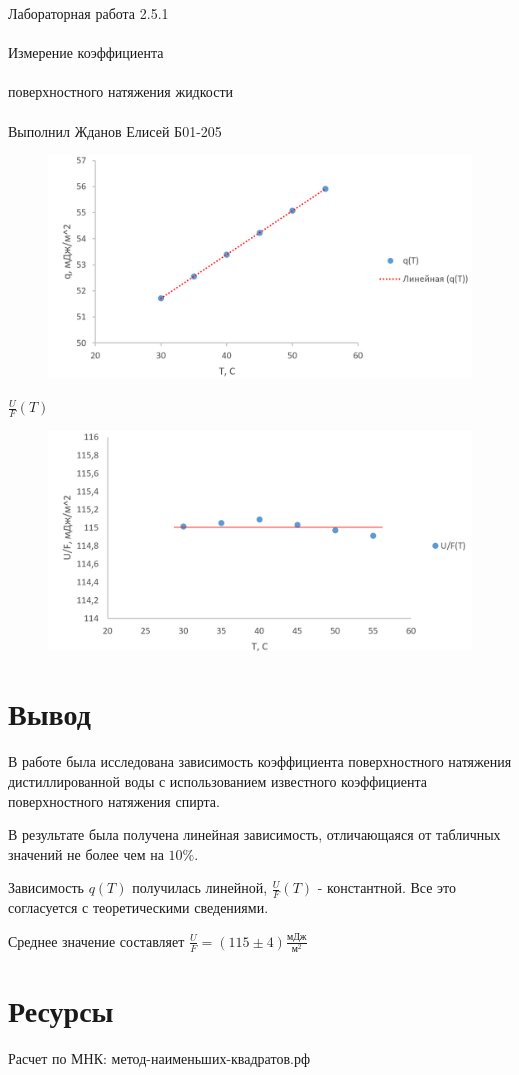 \documentclass{astroedu-lab}
\begin{document}
\begin{problem}{\huge Лабораторная работа 2.5.1\\\\Измерение коэффициента\\\\поверхностного натяжения жидкости\\\\Выполнил Жданов Елисей Б01-205}
\begin{figure}[!h]
	\centering
	\includegraphics[width=1\textwidth]{2023-02-23_22-23-59.png}
	\label{fig:boiler}
\end{figure}

\begin{center}
	\Large $\frac{U}{F}(T)$
\end{center}

\begin{figure}[!h]
	\centering
	\includegraphics[width=1\textwidth]{2023-02-23_22-26-14.png}
	\label{fig:boiler}
\end{figure}

\section{Вывод}

В работе была исследована зависимость коэффициента поверхностного натяжения дистиллированной воды с использованием известного коэффициента поверхностного натяжения спирта.

В результате была получена линейная зависимость, отличающаяся от табличных значений не более чем на $10\%$.

Зависимость $q(T)$ получилась линейной, $\frac{U}{F}(T)$ - константной. Все это согласуется с теоретическими сведениями.

Среднее значение составляет $\frac{U}{F} = (115 \pm 4) \frac{\text{мДж}}{\text{м}^2}$


\section{Ресурсы}

Расчет по МНК: метод-наименьших-квадратов.рф


\end{problem}
\end{document}
